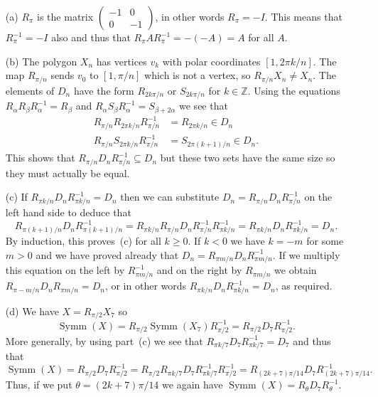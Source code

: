 \documentclass{amsart}
\DeclareMathOperator{\Symm}{Symm}
\renewcommand{\:}{\colon}
\newcommand{\sse}{\subseteq}
\newcommand{\bsm}       {\left(\begin{smallmatrix}}
\newcommand{\esm}       {\end{smallmatrix}\right)}
\newcommand{\Z}{\mathbb{Z}}
\newcommand{\al}        {\alpha}
\newcommand{\bt}        {\beta}
\newcommand{\tht}       {\theta}
\theoremstyle{definition}
\newenvironment{solution}{{\noindent\bf Solution:}}{}
\begin{document}
\begin{solution}
 \begin{itemize}
  \item[(a)] $R_\pi$ is the matrix $\bsm -1&0\\0&-1\esm$, in other
   words $R_\pi=-I$.  This means that $R_\pi^{-1}=-I$ also and thus
   that $R_\pi A R_\pi^{-1}=-(-A)=A$ for all $A$.
  \item[(b)] The polygon $X_n$ has vertices $v_k$ with polar
   coordinates $[1,2\pi k/n]$.  The map $R_{\pi/n}$ sends $v_0$ to
   $[1,\pi/n]$ which is not a vertex, so $R_{\pi/n}X_n\neq X_n$.  The
   elements of $D_n$ have the form $R_{2k\pi/n}$ or $S_{2k\pi/n}$ for
   $k\in\Z$.  Using the equations $R_\al R_\bt R_\al^{-1}=R_\bt$ and
   $R_\al S_\bt R_\al^{-1}=S_{\bt+2\al}$ we see that
   \begin{align*}
    R_{\pi/n} R_{2\pi k/n} R_{\pi/n}^{-1} &= R_{2\pi k/n}\in D_n \\
    R_{\pi/n} S_{2\pi k/n} R_{\pi/n}^{-1} &= S_{2\pi(k+1)/n}\in D_n.
   \end{align*}
   This shows that $R_{\pi/n}D_n R_{\pi/n}^{-1}\sse D_n$ but these two
   sets have the same size so they must actually be equal.
  \item[(c)]
   If $R_{\pi k/n}D_n R_{\pi k/n}^{-1}=D_n$ then we can substitute
   $D_n=R_{\pi/n} D_n R_{\pi/n}^{-1}$ on the left hand side to deduce
   that 
   \[ R_{\pi(k+1)/n}D_n R_{\pi(k+1)/n}^{-1}=
      R_{\pi k/n} R_{\pi/n}D_n R_{\pi/n}^{-1} R_{\pi k/n}^{-1}=
      R_{\pi k/n} D_n R_{\pi k/n}^{-1}=
      D_n.
   \]
   By induction, this proves~(c) for all $k\geq 0$.  If $k<0$ we have
   $k=-m$ for some $m>0$ and we have proved already that 
   $D_n=R_{\pi m/n} D_n R_{\pi m/n}^{-1}$.  If we multiply this
   equation on the left by $R_{\pi m/n}^{-1}$ and on the right by
   $R_{\pi m/n}$ we obtain $R_{\pi -m/n} D_n R_{\pi m/n}=D_n$, or in
   other words $R_{\pi k/n}D_n R_{\pi k/n}^{-1}=D_n$, as required.
  \item[(d)]
   We have $X=R_{\pi/2}X_7$ so 
   \[ \Symm(X) = R_{\pi/2}\Symm(X_7)R_{\pi/2}^{-1}
               = R_{\pi/2} D_7 R_{\pi/2}^{-1} .
   \]
   More generally, by using part~(c) we see that
   $R_{\pi k/7}D_7 R_{\pi k/7}^{-1}=D_7$ and thus that 
   \[ \Symm(X) = R_{\pi/2} D_7 R_{\pi/2}^{-1}
               = R_{\pi/2} R_{\pi k/7}D_7 R_{\pi k/7}^{-1} R_{\pi/2}^{-1}
               = R_{(2k+7)\pi/14} D_7 R_{(2k+7)\pi/14}^{-1}.
   \]
   Thus, if we put $\tht=(2k+7)\pi/14$ we again have
   $\Symm(X)=R_\tht D_7R_\tht^{-1}$. 


\end{itemize}
\end{solution}
\end{document}
